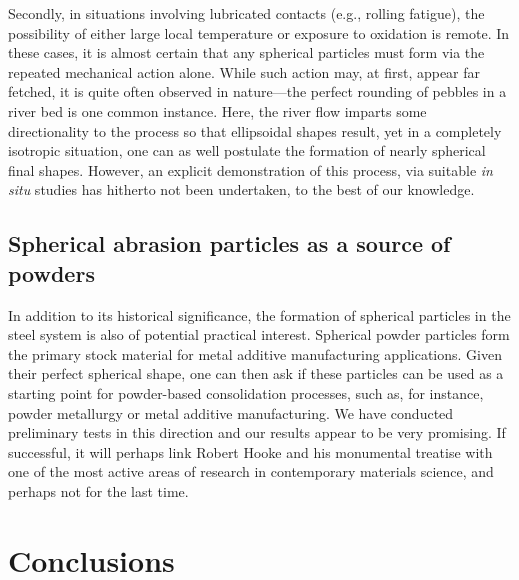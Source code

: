 \documentclass[11pt]{article}
\begin{document}
Secondly, in situations involving lubricated contacts (e.g., rolling fatigue), the possibility of either large local temperature or exposure to oxidation is remote. In these cases, it is almost certain that any spherical particles must form via the repeated mechanical action alone. While such action may, at first, appear far fetched, it is quite often observed in nature---the perfect rounding of pebbles in a river bed is one common instance. Here, the river flow imparts some directionality to the process so that ellipsoidal shapes result, yet in a completely isotropic situation, one can as well postulate the formation of nearly spherical final shapes. However, an explicit demonstration of this process, via suitable \emph{in situ} studies has hitherto not been undertaken, to the best of our knowledge.  

\subsection{Spherical abrasion particles as a source of powders}

In addition to its historical significance, the formation of spherical particles in the steel system is also of potential practical interest. Spherical powder particles form the primary stock material for metal additive manufacturing applications. Given their perfect spherical shape, one can then ask if these particles can be used as a starting point for powder-based consolidation processes, such as, for instance, powder metallurgy or metal additive manufacturing. We have conducted preliminary tests in this direction and our results appear to be very promising. If successful, it will perhaps link Robert Hooke and his monumental treatise with one of the most active areas of research in contemporary materials science, and perhaps not for the last time.


\section{Conclusions}
\label{sec:conclusions}
\end{document}
